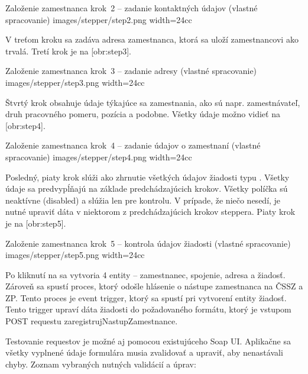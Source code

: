 {Založenie zamestnanca krok~2 -- zadanie kontaktných údajov (vlastné spracovanie)}
{images/stepper/step2.png}
{width=24cc} 

V treťom kroku sa zadáva adresa zamestnanca, ktorá sa uloží zamestnancovi ako trvalá. Tretí krok je na [obr:step3].

{Založenie zamestnanca krok~3 -- zadanie adresy (vlastné spracovanie)}
{images/stepper/step3.png}
{width=24cc} 

Štvrtý krok obsahuje údaje týkajúce sa zamestnania, ako sú napr. zamestnávateľ, druh pracovného pomeru, pozícia a podobne. Všetky údaje možno vidieť na [obr:step4].

{Založenie zamestnanca krok~4 -- zadanie údajov o zamestnaní (vlastné spracovanie)}
{images/stepper/step4.png}
{width=24cc} 

Posledný, piaty krok slúži ako zhrnutie všetkých údajov žiadosti typu . Všetky údaje sa predvypĺňajú na základe predchádzajúcich krokov. Všetky políčka sú neaktívne (disabled) a slúžia len pre kontrolu. V prípade, že niečo nesedí, je nutné upraviť dáta v niektorom z predchádzajúcich krokov steppera. Piaty krok je na [obr:step5].


{Založenie zamestnanca krok~5 -- kontrola údajov žiadosti (vlastné spracovanie)}
{images/stepper/step5.png}
{width=24cc} 

Po kliknutí na  sa vytvoria 4 entity -- zamestnanec, spojenie, adresa a žiadosť. Zároveň sa spustí proces, ktorý odošle hlásenie o nástupe zamestnanca na ČSSZ a ZP. Tento proces je event trigger, ktorý sa spustí pri vytvorení entity žiadosť. Tento trigger upraví dáta žiadosti do požadovaného formátu, ktorý je vstupom POST requestu zaregistrujNastupZamestnance.

Testovanie requestov je možné aj pomocou existujúceho Soap UI. Aplikačne sa všetky vyplnené údaje formulára musia zvalidovať a upraviť, aby nenastávali chyby. Zoznam vybraných nutných validácií a úprav:

